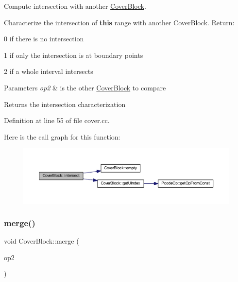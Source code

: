 Compute intersection with another \mbox{\hyperlink{class_cover_block}{Cover\+Block}}. 

Characterize the intersection of {\bfseries{this}} range with another \mbox{\hyperlink{class_cover_block}{Cover\+Block}}. Return\+:
\begin{DoxyItemize}
\item 0 if there is no intersection
\item 1 if only the intersection is at boundary points
\item 2 if a whole interval intersects
\end{DoxyItemize}


\begin{DoxyParams}{Parameters}
{\em op2} & is the other \mbox{\hyperlink{class_cover_block}{Cover\+Block}} to compare \\
\hline
\end{DoxyParams}
\begin{DoxyReturn}{Returns}
the intersection characterization 
\end{DoxyReturn}


Definition at line 55 of file cover.\+cc.

Here is the call graph for this function\+:
\nopagebreak
\begin{figure}[H]
\begin{center}
\leavevmode
\includegraphics[width=350pt]{class_cover_block_a26da4f088471ccf7e896fa2e7f657444_cgraph}
\end{center}
\end{figure}
\mbox{\label{class_cover_block_ad686102d99fec796c67db2778d9981e5}} 
\subsubsection{\texorpdfstring{merge()}{merge()}}
{\footnotesize\ttfamily void Cover\+Block\+::merge (\begin{DoxyParamCaption}\item[{const \mbox{\hyperlink{class_cover_block}{Cover\+Block}} \&}]{op2 }\end{DoxyParamCaption})}



